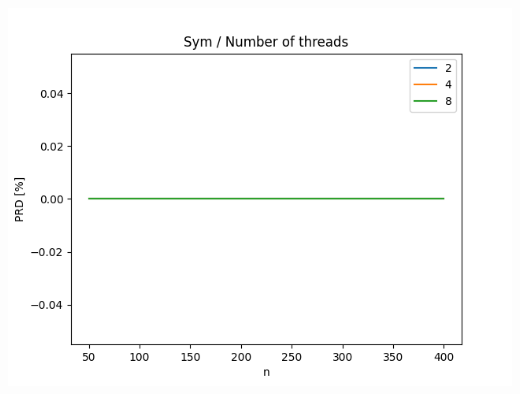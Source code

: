 \documentclass{article}
\begin{document}
\begin{center}
\includegraphics[width=\textwidth, 
                   height = 0.4\textheight, 
                   keepaspectratio]
                  {plots/sym_12_num_of_threads} 
\end{center}
\end{document}
